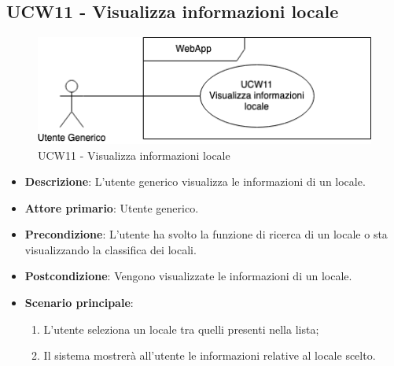\subsection{UCW11 - Visualizza informazioni locale}
\begin{figure}[!h]
\centering
\includegraphics[scale=0.5]{UC_images/UCW11.png} 
\caption{UCW11 - Visualizza informazioni locale}
\end{figure}
\begin{itemize}
    \item \textbf{Descrizione}: L'utente generico visualizza le informazioni di un locale.
    \item \textbf{Attore primario}: Utente generico.
    \item \textbf{Precondizione}: L'utente ha svolto la funzione di ricerca di un locale o sta visualizzando la classifica dei locali.
    \item \textbf{Postcondizione}: Vengono visualizzate le informazioni di un locale.    
    \item \textbf{Scenario principale}: 
    \begin{enumerate}
    \item L'utente seleziona un locale tra quelli presenti nella lista;
    \item Il sistema mostrerà all'utente le informazioni relative al locale scelto.
    \end{enumerate}
\end{itemize}
